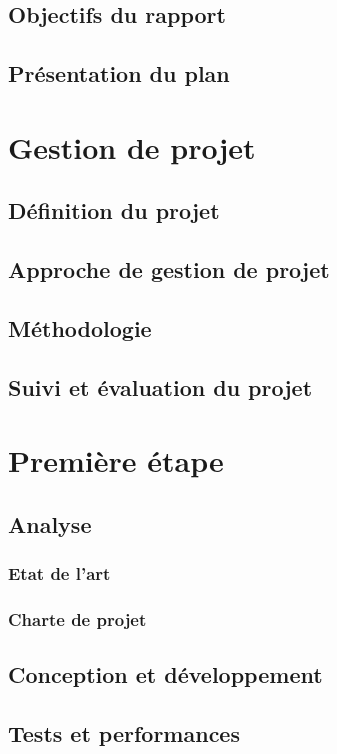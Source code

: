 \documentclass[a4paper, 12pt]{report}
\begin{document}
    \section{Objectifs du rapport}
    \section{Présentation du plan}
    


\chapter{Gestion de projet}
\minitoc
{}
\clearpage
    \section{Définition du projet}
    \section{Approche de gestion de projet}
    \section{Méthodologie}
    \section{Suivi et évaluation du projet}
    

\chapter{Première étape}
\minitoc
{}
\clearpage
    \section{Analyse}
        \subsection{Etat de l'art}
        \subsection{Charte de projet}
    \section{Conception et développement}
    \section{Tests et performances}
\end{document}
